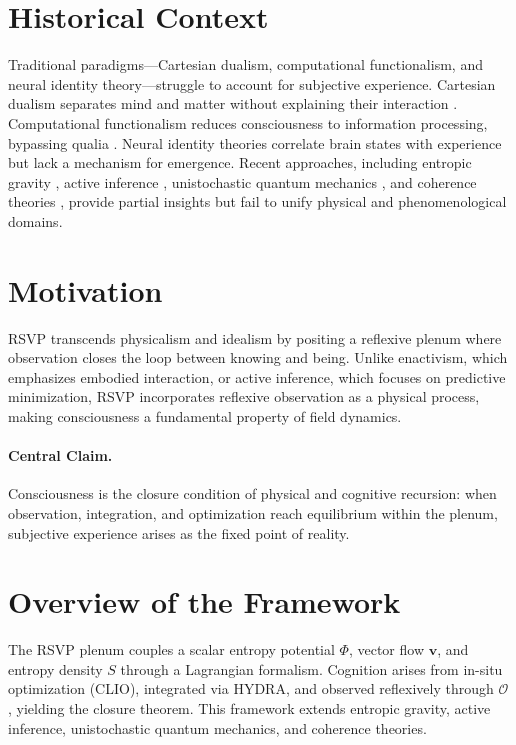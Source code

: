 \documentclass[12pt]{book}
\theoremstyle{definition}
\begin{document}
\section{Historical Context}
\label{sec:historical}
Traditional paradigms—Cartesian dualism, computational functionalism, and neural identity theory—struggle to account for subjective experience. Cartesian dualism separates mind and matter without explaining their interaction \cite{descartes1641meditations}. Computational functionalism reduces consciousness to information processing, bypassing qualia \cite{chalmers1996conscious}. Neural identity theories correlate brain states with experience but lack a mechanism for emergence. Recent approaches, including entropic gravity \cite{jacobson1995thermodynamics, verlinde2011origin, gibbs2025entropic}, active inference \cite{friston2023active, friston2025beautiful}, unistochastic quantum mechanics \cite{barandes2024new, barandes2025unistochastic}, and coherence theories \cite{logan2024unified, logan2025coherence}, provide partial insights but fail to unify physical and phenomenological domains.

\section{Motivation}
\label{sec:motivation}
RSVP transcends physicalism and idealism by positing a reflexive plenum where observation closes the loop between knowing and being. Unlike enactivism, which emphasizes embodied interaction, or active inference, which focuses on predictive minimization, RSVP incorporates reflexive observation as a physical process, making consciousness a fundamental property of field dynamics.

\paragraph{Central Claim.}
Consciousness is the closure condition of physical and cognitive recursion: when observation, integration, and optimization reach equilibrium within the plenum, subjective experience arises as the fixed point of reality.

\section{Overview of the Framework}
\label{sec:overview}
The RSVP plenum couples a scalar entropy potential \(\Phi\), vector flow \(\mathbf{v}\), and entropy density \(S\) through a Lagrangian formalism. Cognition arises from in-situ optimization (CLIO), integrated via HYDRA, and observed reflexively through \(\mathcal{O}\), yielding the closure theorem. This framework extends entropic gravity, active inference, unistochastic quantum mechanics, and coherence theories.
\end{document}
